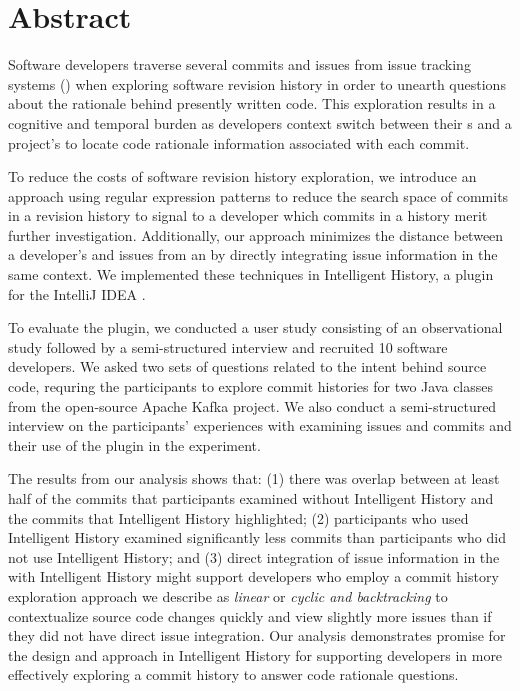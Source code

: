 
\chapter{Abstract}


Software developers traverse several commits and issues from issue tracking systems ()
when exploring software revision history in order to unearth questions about the rationale behind presently written code.
This exploration results in a cognitive and temporal burden as developers
context switch between their s and a project's  to locate code rationale information
associated with each commit.

To reduce the costs of software revision history exploration,
we introduce an approach using regular expression patterns to reduce the search space of commits in a revision history to signal to a developer which commits in a history merit further investigation.
Additionally, our approach minimizes the distance between a developer's  and issues from an 
by directly integrating issue information in the same context.
We implemented these techniques in Intelligent History, a plugin for the IntelliJ IDEA .

To evaluate the plugin, we conducted a user study consisting of an observational 
study followed by a semi-structured interview and recruited 10 software developers.
We asked two sets of questions related to the intent behind source code, requring the participants to explore 
commit histories for two Java classes from the open-source Apache Kafka project.
We also conduct a semi-structured interview on the participants' experiences with examining issues and commits 
and their use of the plugin in the experiment.

The results from our analysis shows that:
(1) there was overlap between at least half of the commits
that participants examined without Intelligent History and the commits that Intelligent History
highlighted; (2) participants who used Intelligent History examined significantly
less commits than participants who did not use Intelligent History;
and (3) direct integration of issue information in the 
with Intelligent History might support developers who employ a commit history exploration approach
we describe as \textit{linear} or \textit{cyclic and backtracking} to contextualize
source code changes quickly and view slightly more issues than if they did not have
direct issue integration.
Our analysis demonstrates promise for the design and approach in Intelligent History
for supporting developers in more effectively exploring a commit history to answer code rationale questions.


